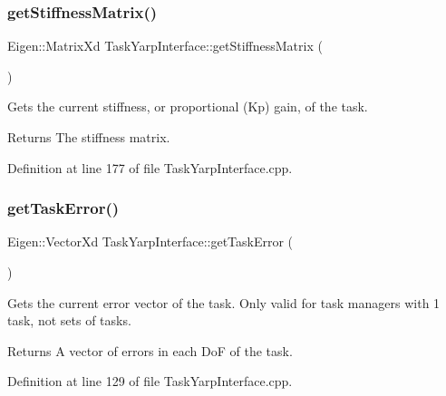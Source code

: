 \hypertarget{classocra_1_1TaskYarpInterface_a8295f6038a0a1bde584eb0e94d3defa7}{}\label{classocra_1_1TaskYarpInterface_a8295f6038a0a1bde584eb0e94d3defa7} 
\subsubsection{\texorpdfstring{get\+Stiffness\+Matrix()}{getStiffnessMatrix()}}
{\footnotesize\ttfamily Eigen\+::\+Matrix\+Xd Task\+Yarp\+Interface\+::get\+Stiffness\+Matrix (\begin{DoxyParamCaption}{ }\end{DoxyParamCaption})}

Gets the current stiffness, or proportional (Kp) gain, of the task.

\begin{DoxyReturn}{Returns}
The stiffness matrix. 
\end{DoxyReturn}


Definition at line 177 of file Task\+Yarp\+Interface.\+cpp.

\hypertarget{classocra_1_1TaskYarpInterface_aba04c31ffba30d3fb42dd82b0529a7b8}{}\label{classocra_1_1TaskYarpInterface_aba04c31ffba30d3fb42dd82b0529a7b8} 
\subsubsection{\texorpdfstring{get\+Task\+Error()}{getTaskError()}}
{\footnotesize\ttfamily Eigen\+::\+Vector\+Xd Task\+Yarp\+Interface\+::get\+Task\+Error (\begin{DoxyParamCaption}{ }\end{DoxyParamCaption})}

Gets the current error vector of the task.  Only valid for task managers with 1 task, not sets of tasks.

\begin{DoxyReturn}{Returns}
A vector of errors in each DoF of the task. 
\end{DoxyReturn}


Definition at line 129 of file Task\+Yarp\+Interface.\+cpp.

